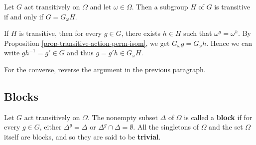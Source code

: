 \begin{corollary} \label{cor-Frattini-transitive}
	Let $G$ act transitively on $\Omega$ and let $\omega\in\Omega$. Then a subgroup $H$ of $G$ is transitive if and only if $G = G_\omega H$.
\end{corollary}
\begin{sketch}
If $H$ is transitive, then for every $g\in G$, there exists $h\in H$ such that $\omega^g = \omega^h$. By Proposition \ref{prop-transitive-action-perm-isom}, we get $G_\omega g = G_\omega h$. Hence we can write $gh^{-1} = g'\in G$ and thus $g = g'h\in G_\omega H$.
	
For the converse, reverse the argument in the previous paragraph.
\end{sketch}

\subsection{Blocks}
\begin{definition}
	Let $G$ act transitively on $\Omega$. The nonempty subset $\Delta$ of $\Omega$ is called a \textbf{block} if for every $g\in G$, either $\Delta^g=\Delta$ or $\Delta^g \cap \Delta = \emptyset$. All the singletons of $\Omega$ and the set $\Omega$ itself are blocks, and so they are said to be \textbf{trivial}.
\end{definition}



